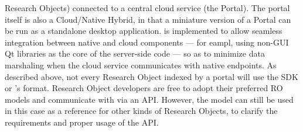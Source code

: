 \documentclass[11pt,letterpaper]{article}
\begin{document}
Research Objects) connected to a central 
cloud service (the {\MOSAIC} Portal).  The portal 
itself is also a Cloud/Native Hybrid, in that a 
miniature version of a {\MOSAIC} Portal can be run 
as a standalone desktop application.  {\MOSAIC} 
is implemented to allow seamless integration between 
native and cloud components --- for eampl, 
using non-GUI Qt libraries as the core of the 
server-side code --- so as to minimize data 
marshaling when the cloud service 
communicates with native endpoints.
\p{}
As described above, not every Research Object indexed 
by a {\MOSAIC} portal will use the {\MOSAIC} SDK or 
{\MOSAIC}'s {\RAK} format.  Research Object developers are 
free to adopt their preferred RO models and 
communicate with {\MOSAIC} via an API.  However, 
the {\RAK} model can still be used in this case as a 
reference for other kinds of Research Objects, 
to clarify the requirements and 
proper usage of the {\MOSAIC} API.
\p{}
\end{document}
